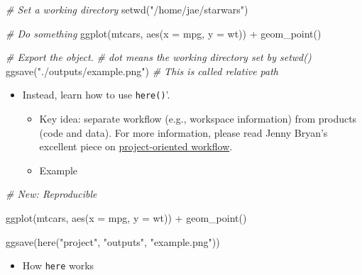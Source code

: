 \documentclass[
]{book}
\newenvironment{Shaded}{\begin{snugshade}}{\end{snugshade}}
\newcommand{\AttributeTok}[1]{\textcolor[rgb]{0.77,0.63,0.00}{#1}}
\newcommand{\CommentTok}[1]{\textcolor[rgb]{0.56,0.35,0.01}{\textit{#1}}}
\newcommand{\FunctionTok}[1]{\textcolor[rgb]{0.00,0.00,0.00}{#1}}
\newcommand{\NormalTok}[1]{#1}
\newcommand{\SpecialCharTok}[1]{\textcolor[rgb]{0.00,0.00,0.00}{#1}}
\newcommand{\StringTok}[1]{\textcolor[rgb]{0.31,0.60,0.02}{#1}}
\providecommand{\tightlist}{%
  \setlength{\itemsep}{0pt}\setlength{\parskip}{0pt}}
\begin{document}
\begin{Shaded}
\begin{Highlighting}[]
\CommentTok{\# Set a working directory }
\FunctionTok{setwd}\NormalTok{(}\StringTok{"/home/jae/starwars"}\NormalTok{)}

\CommentTok{\# Do something }
\FunctionTok{ggplot}\NormalTok{(mtcars, }\FunctionTok{aes}\NormalTok{(}\AttributeTok{x =}\NormalTok{ mpg, }\AttributeTok{y =}\NormalTok{ wt)) }\SpecialCharTok{+}
   \FunctionTok{geom\_point}\NormalTok{()}

\CommentTok{\# Export the object. }
\CommentTok{\# dot means the working directory set by setwd()}
\FunctionTok{ggsave}\NormalTok{(}\StringTok{"./outputs/example.png"}\NormalTok{) }\CommentTok{\# This is called relative path }
\end{Highlighting}
\end{Shaded}

\begin{itemize}
\item
  Instead, learn how to use \texttt{here()}'.

  \begin{itemize}
  \item
    Key idea: separate workflow (e.g., workspace information) from products (code and data). For more information, please read Jenny Bryan's excellent piece on \href{https://www.tidyverse.org/blog/2017/12/workflow-vs-script/}{project-oriented workflow}.
  \item
    Example
  \end{itemize}
\end{itemize}

\begin{Shaded}
\begin{Highlighting}[]
\CommentTok{\# New: Reproducible }

\FunctionTok{ggplot}\NormalTok{(mtcars, }\FunctionTok{aes}\NormalTok{(}\AttributeTok{x =}\NormalTok{ mpg, }\AttributeTok{y =}\NormalTok{ wt)) }\SpecialCharTok{+}
   \FunctionTok{geom\_point}\NormalTok{()}

\FunctionTok{ggsave}\NormalTok{(}\FunctionTok{here}\NormalTok{(}\StringTok{"project"}\NormalTok{, }\StringTok{"outputs"}\NormalTok{, }\StringTok{"example.png"}\NormalTok{))}
\end{Highlighting}
\end{Shaded}

\begin{itemize}
\tightlist
\item
  How \texttt{here} works
\end{itemize}
\end{document}
